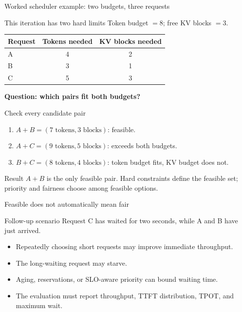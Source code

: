 \documentclass[aspectratio=169,11pt]{beamer}
\newcommand{\term}[1]{\textcolor{HUSTBlue}{\textbf{#1}}}
\begin{document}
\begin{frame}{Worked scheduler example: two budgets, three requests}
  \begin{block}{This iteration has two hard limits}
    Token budget \(=8\); free KV blocks \(=3\).
  \end{block}
  \begin{center}
    \begin{tabular}{lcc}
      \toprule
      Request & Tokens needed & KV blocks needed \\
      \midrule
      A & 4 & 2 \\
      B & 3 & 1 \\
      C & 5 & 3 \\
      \bottomrule
    \end{tabular}
  \end{center}
  \vspace{0.2cm}
  \term{Question: which pairs fit both budgets?}
\end{frame}

\begin{frame}{Check every candidate pair}
  \begin{enumerate}
    \item \(A+B=(7\text{ tokens},3\text{ blocks})\): feasible.
    \item \(A+C=(9\text{ tokens},5\text{ blocks})\): exceeds both budgets.
    \item \(B+C=(8\text{ tokens},4\text{ blocks})\): token budget fits, KV budget does not.
  \end{enumerate}
  \vspace{0.28cm}
  \begin{block}{Result}
    \(A+B\) is the only feasible pair. Hard constraints define the feasible set; priority and fairness choose among feasible options.
  \end{block}
\end{frame}

\iffalse %
\begin{frame}{Feasible does not automatically mean fair}
  \begin{block}{Follow-up scenario}
    Request C has waited for two seconds, while A and B have just arrived.
  \end{block}
  \begin{itemize}
    \item Repeatedly choosing short requests may improve immediate throughput.
    \item The long-waiting request may starve.
    \item Aging, reservations, or SLO-aware priority can bound waiting time.
    \item The evaluation must report throughput, TTFT distribution, TPOT, and maximum wait.
  \end{itemize}
\end{frame}
\end{document}

